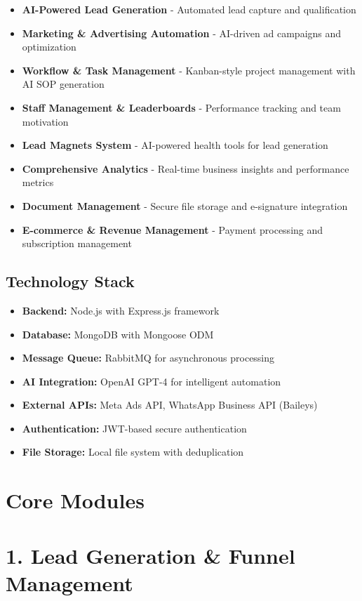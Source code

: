 \documentclass[12pt,a4paper]{article}
\begin{document}
\begin{itemize}
    \item \textbf{AI-Powered Lead Generation} - Automated lead capture and qualification
    \item \textbf{Marketing \& Advertising Automation} - AI-driven ad campaigns and optimization
    \item \textbf{Workflow \& Task Management} - Kanban-style project management with AI SOP generation
    \item \textbf{Staff Management \& Leaderboards} - Performance tracking and team motivation
    \item \textbf{Lead Magnets System} - AI-powered health tools for lead generation
    \item \textbf{Comprehensive Analytics} - Real-time business insights and performance metrics
    \item \textbf{Document Management} - Secure file storage and e-signature integration
    \item \textbf{E-commerce \& Revenue Management} - Payment processing and subscription management
\end{itemize}

\subsection{Technology Stack}

\begin{itemize}
    \item \textbf{Backend:} Node.js with Express.js framework
    \item \textbf{Database:} MongoDB with Mongoose ODM
    \item \textbf{Message Queue:} RabbitMQ for asynchronous processing
    \item \textbf{AI Integration:} OpenAI GPT-4 for intelligent automation
    \item \textbf{External APIs:} Meta Ads API, WhatsApp Business API (Baileys)
    \item \textbf{Authentication:} JWT-based secure authentication
    \item \textbf{File Storage:} Local file system with deduplication
\end{itemize}

\section{Core Modules}

\section{1. Lead Generation \& Funnel Management}
\end{document}
